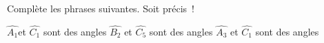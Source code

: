 %
%
Complète les phrases suivantes. Soit précis~!
    \begin{center}
    \end{center}
    \begin{tasks}
        \task $\widehat{A_{1}}$et $\widehat{C_{1}}$ sont des angles \dotfill
        \task $\widehat{B_{2}}$ et $\widehat{C_{5}}$ sont des angles \dotfill
        \task $\widehat{A_{3}}$ et $\widehat{C_{1}}$ sont des angles \dotfill
    \end{tasks}
